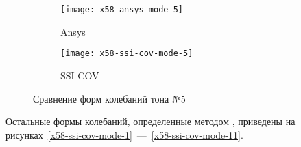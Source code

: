 
\begin{figure}[!htb]
	\centering
	\begin{subfigure}{0.49\textwidth}
		\texttt{[image: x58-ansys-mode-5]}
		\caption{Ansys}
	\end{subfigure}
	\begin{subfigure}{0.49\textwidth}
		\texttt{[image: x58-ssi-cov-mode-5]}
		\caption{SSI-COV}
	\end{subfigure}
     \caption{Сравнение форм колебаний тона №5} \label{x58-mode-compare}
\end{figure}

Остальные формы колебаний, определенные методом , приведены на рисунках~\ref{x58-ssi-cov-mode-1}~---~\ref{x58-ssi-cov-mode-11}.

